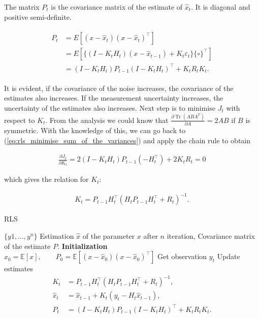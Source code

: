 The matrix $P_t$  is the covariance matrix of the estimate of \(\hat{x}_t\). It is diagonal and positive semi-definite.

\begin{equation*}
\begin{aligned}
\begin{aligned}
P_t 
&= E\left[ (x-\hat{x}_t)(x-\hat{x}_t)^\intercal \right] \\[2mm]
&= E\left[ \{(I - K_t H_t)(x - \hat{x}_{t-1}) + K_t \varepsilon_t\} \{\circ\}^\intercal \right] \\[2mm]
&= (I - K_t H_t) P_{t-1} (I - K_t H_t)^\intercal + K_t R_t K_t.
\end{aligned}
\end{aligned}
\end{equation*}

It is evident, if the covariance of the noise increases, the covariance of the estimates also increases. If the measurement uncertainty increases, the uncertainty of the estimates also increases. Next step is to minimise  \(J_t\) with respect to \(K_t\). From the analysis we could know that \(\frac{\partial \operatorname{Tr}\left(A B A^T\right)}{\partial A}=2 A B\) if \(B\) is symmetric. With the knowledge of this, we can go back to (\ref{eq:rls_minimise_sum_of_the_variances}) and apply the chain rule to obtain

\begin{equation*}
\begin{aligned}
\frac{\partial J_t}{\partial K_t} = 2(I-K_t H_t)P_{t-1} (-H_t^\intercal) + 2K_t R_t = 0
\end{aligned}
\end{equation*}

\noindent which gives the relation for \(K_t\):

\begin{equation}
\begin{aligned}
K_t = P_{t-1} H_t^\intercal (H_t P_{t-1} H_t^\intercal + R_t)^{-1}. \label{eq:rls_gain_computation}
\end{aligned}
\end{equation}

\begin{algorithm}
    \caption{RLS}
  \begin{algorithmic}[1]
    \INPUT \(\{y1, . . . , y^n\}\)
    \OUTPUT Estimation \(\hat{x}\) of the parameter \(x\) after \(n\) iteration, Covariance matrix of the estimate \(P\).
    \STATE \textbf{Initialization} \(\hat{x}_0 = \mathbb{E}[x], \qquad P_0 = \mathbb{E}[(x-\hat x_0)(x-\hat x_0)^\intercal]\)
      \STATE Get observation \(y_t\)
      \STATE Update estimates
        \begin{align*}
            K_t &= P_{t-1} H_t^\intercal (H_t P_{t-1} H_t^\intercal + R_t)^{-1},\\
            \hat{x}_t &= \hat{x}_{t-1} + K_t(y_t - H_t \hat{x}_{t-1}), \\
            P_t &= (I - K_t H_t) P_{t-1} (I - K_t H_t)^\intercal + K_t R_t K_t.
        \end{align*}
    \ENDFOR
  \end{algorithmic}
\end{algorithm}

